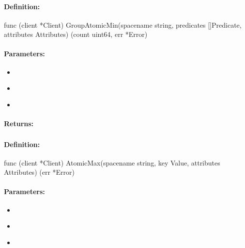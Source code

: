 \paragraph{Definition:}
\begin{gocode}
func (client *Client) GroupAtomicMin(spacename string, predicates []Predicate, attributes Attributes) (count uint64, err *Error)
\end{gocode}

\paragraph{Parameters:}
\begin{itemize}[noitemsep]
\item {}\\

\item {}\\

\item {}\\

\end{itemize}

\paragraph{Returns:}


\pagebreak
\subsubsection{}
\label{api:Go:AtomicMax}


\paragraph{Definition:}
\begin{gocode}
func (client *Client) AtomicMax(spacename string, key Value, attributes Attributes) (err *Error)
\end{gocode}

\paragraph{Parameters:}
\begin{itemize}[noitemsep]
\item {}\\

\item {}\\

\item {}\\

\end{itemize}

